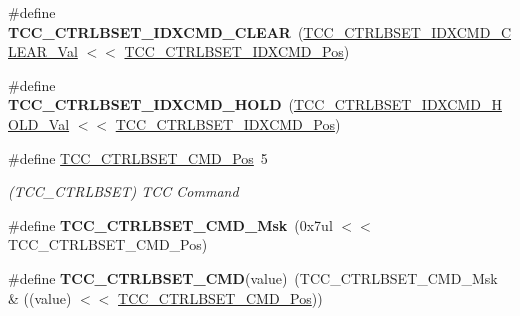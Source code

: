 \begin{DoxyCompactItemize}
\item 
\hypertarget{group___s_a_m_l21___t_c_c_ga7d2f0d107aa008038ee0a1ea7d40a275}{}\#define {\bfseries T\+C\+C\+\_\+\+C\+T\+R\+L\+B\+S\+E\+T\+\_\+\+I\+D\+X\+C\+M\+D\+\_\+\+C\+L\+E\+A\+R}~(\hyperlink{group___s_a_m_l21___t_c_c_ga31ec8f2cf2a8ad4b3097d7d379c96a27}{T\+C\+C\+\_\+\+C\+T\+R\+L\+B\+S\+E\+T\+\_\+\+I\+D\+X\+C\+M\+D\+\_\+\+C\+L\+E\+A\+R\+\_\+\+Val} $<$$<$ \hyperlink{group___s_a_m_l21___t_c_c_gad1a19b5640a5a4f1da6cd99bf0f2cfcd}{T\+C\+C\+\_\+\+C\+T\+R\+L\+B\+S\+E\+T\+\_\+\+I\+D\+X\+C\+M\+D\+\_\+\+Pos})\label{group___s_a_m_l21___t_c_c_ga7d2f0d107aa008038ee0a1ea7d40a275}

\item 
\hypertarget{group___s_a_m_l21___t_c_c_ga75102d065245bc302c3f445d2bda1954}{}\#define {\bfseries T\+C\+C\+\_\+\+C\+T\+R\+L\+B\+S\+E\+T\+\_\+\+I\+D\+X\+C\+M\+D\+\_\+\+H\+O\+L\+D}~(\hyperlink{group___s_a_m_l21___t_c_c_ga890a09b5254cd8ce68584c6c6c358830}{T\+C\+C\+\_\+\+C\+T\+R\+L\+B\+S\+E\+T\+\_\+\+I\+D\+X\+C\+M\+D\+\_\+\+H\+O\+L\+D\+\_\+\+Val}  $<$$<$ \hyperlink{group___s_a_m_l21___t_c_c_gad1a19b5640a5a4f1da6cd99bf0f2cfcd}{T\+C\+C\+\_\+\+C\+T\+R\+L\+B\+S\+E\+T\+\_\+\+I\+D\+X\+C\+M\+D\+\_\+\+Pos})\label{group___s_a_m_l21___t_c_c_ga75102d065245bc302c3f445d2bda1954}

\item 
\hypertarget{group___s_a_m_l21___t_c_c_ga67d1f1c91cc27fd3e6e38f740329a45a}{}\#define \hyperlink{group___s_a_m_l21___t_c_c_ga67d1f1c91cc27fd3e6e38f740329a45a}{T\+C\+C\+\_\+\+C\+T\+R\+L\+B\+S\+E\+T\+\_\+\+C\+M\+D\+\_\+\+Pos}~5\label{group___s_a_m_l21___t_c_c_ga67d1f1c91cc27fd3e6e38f740329a45a}

\begin{DoxyCompactList}\small\item\em (T\+C\+C\+\_\+\+C\+T\+R\+L\+B\+S\+E\+T) T\+C\+C Command \end{DoxyCompactList}\item 
\hypertarget{group___s_a_m_l21___t_c_c_gacd0d1da839ae155fd27a1f010b14367e}{}\#define {\bfseries T\+C\+C\+\_\+\+C\+T\+R\+L\+B\+S\+E\+T\+\_\+\+C\+M\+D\+\_\+\+Msk}~(0x7ul $<$$<$ T\+C\+C\+\_\+\+C\+T\+R\+L\+B\+S\+E\+T\+\_\+\+C\+M\+D\+\_\+\+Pos)\label{group___s_a_m_l21___t_c_c_gacd0d1da839ae155fd27a1f010b14367e}

\item 
\hypertarget{group___s_a_m_l21___t_c_c_ga337c0777401494972bc317872c752247}{}\#define {\bfseries T\+C\+C\+\_\+\+C\+T\+R\+L\+B\+S\+E\+T\+\_\+\+C\+M\+D}(value)~(T\+C\+C\+\_\+\+C\+T\+R\+L\+B\+S\+E\+T\+\_\+\+C\+M\+D\+\_\+\+Msk \& ((value) $<$$<$ \hyperlink{group___s_a_m_l21___t_c_c_ga67d1f1c91cc27fd3e6e38f740329a45a}{T\+C\+C\+\_\+\+C\+T\+R\+L\+B\+S\+E\+T\+\_\+\+C\+M\+D\+\_\+\+Pos}))\label{group___s_a_m_l21___t_c_c_ga337c0777401494972bc317872c752247}


\end{DoxyCompactItemize}
